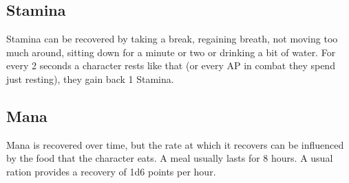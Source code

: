 \subsection{Stamina}\label{subsec:recoverStamina}
Stamina can be recovered by taking a break, regaining breath, not moving too much around, sitting down for a minute or two or drinking a bit of water.
For every 2 seconds a character rests like that (or every AP in combat they spend just resting), they gain back 1 Stamina.


\subsection{Mana}\label{subsec:recoverMana}
Mana is recovered over time, but the rate at which it recovers can be influenced by the food that the character eats.
A meal usually lasts for 8 hours.
A usual ration provides a recovery of 1d6 points per hour.